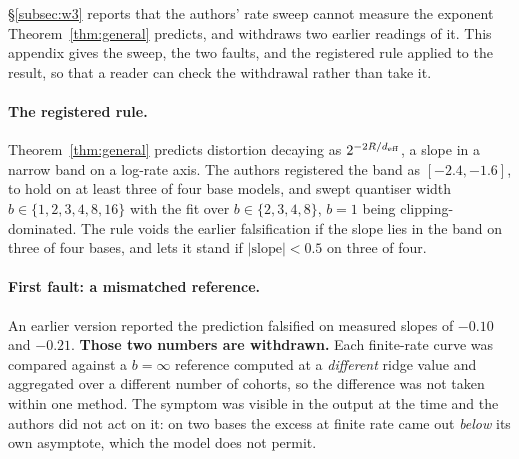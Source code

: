 \S\ref{subsec:w3} reports that the authors' rate sweep cannot measure the exponent
Theorem~\ref{thm:general} predicts, and withdraws two earlier readings of
it. This appendix gives the sweep, the two faults, and the registered rule
applied to the result, so that a reader can check the withdrawal rather
than take it.

\paragraph{The registered rule.} Theorem~\ref{thm:general} predicts
distortion decaying as $2^{-2R/d_{\mathrm{eff}}}$, a slope in a narrow band on a
log-rate axis. The authors registered the band as $[-2.4, -1.6]$, to hold on at
least three of four base models, and swept quantiser width $b \in
\{1,2,3,4,8,16\}$ with the fit over $b \in \{2,3,4,8\}$, $b = 1$ being
clipping-dominated. The rule voids the earlier falsification if the slope
lies in the band on three of four bases, and lets it stand if
$|\mathrm{slope}| < 0.5$ on three of four.

\paragraph{First fault: a mismatched reference.} An earlier version
reported the prediction falsified on measured slopes of $-0.10$ and
$-0.21$. \textbf{Those two numbers are withdrawn.} Each finite-rate curve
was compared against a $b = \infty$ reference computed at a
\emph{different} ridge value and aggregated over a different number of
cohorts, so the difference was not taken within one method. The symptom was
visible in the output at the time and the authors did not act on it: on two bases
the excess at finite rate came out \emph{below} its own asymptote, which
the model does not permit.

